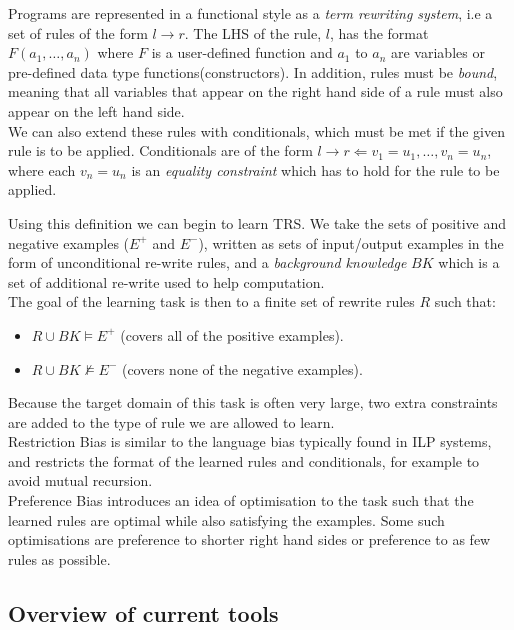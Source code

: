 Programs are represented in a functional style as a \textit{term rewriting system}, i.e a set of rules of the form $l \rightarrow r$. The LHS of the rule, $l$, has the format $F(a_1, \dots, a_n)$ where $F$ is a user-defined function and $a_1$ to $a_n$ are variables or pre-defined data type functions(constructors). In addition, rules must be \textit{bound}, meaning that all variables that appear on the right hand side of a rule must also appear on the left hand side.\\

We can also extend these rules with conditionals, which must be met if the given rule is to be applied. Conditionals are of the form $l \rightarrow r \Leftarrow v_1 = u_1, \dots, v_n = u_n$, where each $v_n = u_n$ is an \textit{equality constraint} which has to hold for the rule to be applied.

Using this definition we can begin to learn TRS. We take the sets of positive and negative examples ($E^+$ and $E^-$), written as sets of input/output examples in the form of unconditional re-write rules, and a \textit{background knowledge} $BK$ which is a set of additional re-write used to help computation. \\

The goal of the learning task is then to a finite set of rewrite rules $R$ such that:

\begin{itemize}
\item $R \cup BK \models E^+$ (covers all of the positive examples).
\item $R \cup BK \not \models E^-$ (covers none of the negative examples).
\end{itemize}

Because the target domain of this task is often very large, two extra constraints are added to the type of rule we are allowed to learn.\\
Restriction Bias is similar to the language bias typically found in ILP systems, and restricts the format of the learned rules and conditionals, for example to avoid mutual recursion. \\
Preference Bias introduces an idea of optimisation to the task such that the learned rules are optimal while also satisfying the examples. Some such optimisations are preference to shorter right hand sides or preference to as few rules as possible.

\subsection{Overview of current tools}

